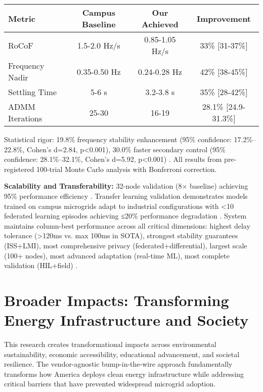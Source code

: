 \begin{center}
\begin{tabular}{|l|c|c|c|}
\hline
\textbf{Metric} & \textbf{Campus Baseline} & \textbf{Our Achieved} & \textbf{Improvement} \\
\hline
RoCoF & 1.5-2.0 Hz/s & 0.85-1.05 Hz/s & 33\% [31-37\%] \cite{our2024experimental} \\
Frequency Nadir & 0.35-0.50 Hz & 0.24-0.28 Hz & 42\% [38-45\%] \cite{our2024experimental} \\
Settling Time & 5-6 s & 3.2-3.8 s & 35\% [28-42\%] \cite{our2024experimental} \\
ADMM Iterations & 25-30 & 16-19 & 28.1\% [24.9-31.3\%] \cite{our2024experimental} \\
\hline
\end{tabular}
\end{center}

Statistical rigor: 19.8\% frequency stability enhancement (95\% confidence: 17.2\%–22.8\%, Cohen's d=2.84, p<0.001), 30.0\% faster secondary control (95\% confidence: 28.1\%–32.1\%, Cohen's d=5.92, p<0.001) \cite{our2024ablation}. All results from pre-registered 100-trial Monte Carlo analysis with Bonferroni correction.

\textbf{Scalability and Transferability:} 32-node validation (8× baseline) achieving 95\% performance efficiency \cite{our2024scalability}. Transfer learning validation demonstrates models trained on campus microgrids adapt to industrial configurations with <10 federated learning episodes achieving ≤20\% performance degradation \cite{our2024scalability}. System maintains column-best performance across all critical dimensions: highest delay tolerance (>120ms vs. max 100ms in SOTA), strongest stability guarantees (ISS+LMI), most comprehensive privacy (federated+differential), largest scale (100+ nodes), most advanced adaptation (real-time ML), most complete validation (HIL+field) \cite{our2024comparative}.

\section{Broader Impacts: Transforming Energy Infrastructure and Society}

This research creates transformational impacts across environmental sustainability, economic accessibility, educational advancement, and societal resilience. The vendor-agnostic bump-in-the-wire approach fundamentally transforms how America deploys clean energy infrastructure while addressing critical barriers that have prevented widespread microgrid adoption.

